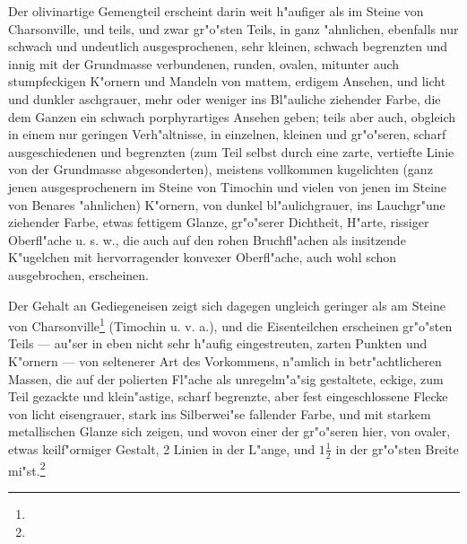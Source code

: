 \documentclass[a4paper, 11pt, oneside, german]{article}
\begin{document}
Der olivinartige Gemengteil erscheint darin weit h"aufiger als im Steine von Charsonville, und teils, und zwar gr"o"sten Teils, in ganz "ahnlichen, ebenfalls nur schwach und undeutlich ausgesprochenen, sehr kleinen, schwach begrenzten und innig mit der Grundmasse verbundenen, runden, ovalen, mitunter auch stumpfeckigen K"ornern und Mandeln von mattem, erdigem Ansehen, und licht und dunkler aschgrauer, mehr oder weniger ins Bl"auliche ziehender Farbe, die dem Ganzen ein schwach porphyrartiges Ansehen geben; teils aber auch, obgleich in einem nur geringen Verh"altnisse, in einzelnen, kleinen und gr"o"seren, scharf ausgeschiedenen und begrenzten (zum Teil selbst durch eine zarte, vertiefte Linie von der Grundmasse abgesonderten), meistens vollkommen kugelichten (ganz jenen ausgesprochenern im Steine von Timochin und vielen von jenen im Steine von Benares "ahnlichen) K"ornern, von dunkel bl"aulichgrauer, ins Lauchgr"une ziehender Farbe, etwas fettigem Glanze, gr"o"serer Dichtheit, H"arte, rissiger Oberfl"ache u. s. w., die auch auf den rohen Bruchfl"achen als insitzende K"ugelchen mit hervorragender konvexer Oberfl"ache, auch wohl schon ausgebrochen, erscheinen.

Der Gehalt an Gediegeneisen zeigt sich dagegen ungleich geringer als am Steine von Charsonville\footnote{} (Timochin u. v. a.), und die Eisenteilchen erscheinen gr"o"sten Teils --- au"ser in eben nicht sehr h"aufig eingestreuten, zarten Punkten und K"ornern --- von seltenerer Art des Vorkommens, n"amlich in betr"achtlicheren Massen, die auf der polierten Fl"ache als unregelm"a"sig gestaltete, eckige, zum Teil gezackte und klein"astige, scharf begrenzte, aber fest eingeschlossene Flecke von licht eisengrauer, stark ins Silberwei"se fallender Farbe, und mit starkem metallischen Glanze sich zeigen, und wovon einer der gr"o"seren hier, von ovaler, etwas keilf"ormiger Gestalt, 2 Linien in der L"ange, und $1\frac{1}{2}$ in der gr"o"sten Breite mi"st.\footnote{}
\end{document}
